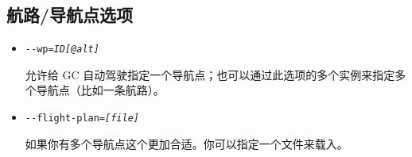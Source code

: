 \ifchinese
{
  \subsection{航路/导航点选项}
\begin{itemize}
  \item{\texttt{-$ $-wp={\it ID[@alt]}}}

  允许给 GC 自动驾驶指定一个导航点；也可以通过此选项的多个实例来指定多个导航点（比如一条航路）。

\item{\texttt{-$ $-flight-plan={\it [file]}}}

  如果你有多个导航点这个更加合适。你可以指定一个文件来载入。

\end{itemize}
}
\fi

